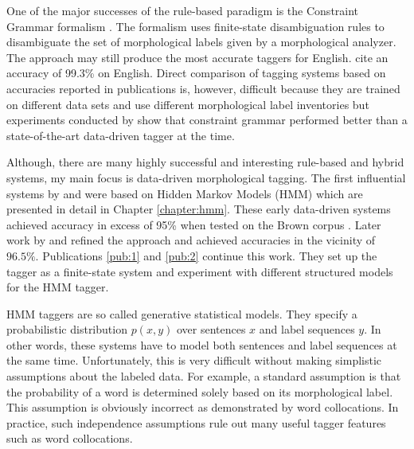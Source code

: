 One of the major successes of the rule-based paradigm is the
Constraint Grammar formalism \citep{Karlsson1995}. The formalism uses
finite-state disambiguation rules to disambiguate the set of
morphological labels given by a morphological analyzer. The approach
may still produce the most accurate taggers for English.
\cite{Voutilainen1995} cite an accuracy of 99.3\% on English. Direct
comparison of tagging systems based on accuracies reported in
publications is, however, difficult because they are trained on
different data sets and use different morphological label inventories
but experiments conducted by \cite{Samuelsson1997} show that
constraint grammar performed better than a state-of-the-art
data-driven tagger at the time.

Although, there are many highly successful and interesting rule-based
and hybrid systems, my main focus is data-driven morphological
tagging. The first influential systems by \cite{Church1988} and
\cite{DeRose1988} were based on Hidden Markov Models (HMM) which are
presented in detail in Chapter \ref{chapter:hmm}. These early
data-driven systems achieved accuracy in excess of 95\% when tested on
the Brown corpus \citep{Francis1964}. Later work by \cite{Brants2000}
and \cite{Halacsy2007} refined the approach and achieved accuracies in
the vicinity of $96.5\%$. Publications \ref{pub:1} and
\ref{pub:2} continue this work. They set up the tagger as a
finite-state system and experiment with different structured models
for the HMM tagger.

HMM taggers are so called generative statistical models. They specify
a probabilistic distribution $p(x,y)$ over sentences $x$ and label
sequences $y$. In other words, these systems have to model both
sentences and label sequences at the same time. Unfortunately, this is
very difficult without making simplistic assumptions about the labeled
data. For example, a standard assumption is that the probability of a
word is determined solely based on its morphological label. This
assumption is obviously incorrect as demonstrated by word
collocations. In practice, such independence assumptions rule out many
useful tagger features such as word collocations.


